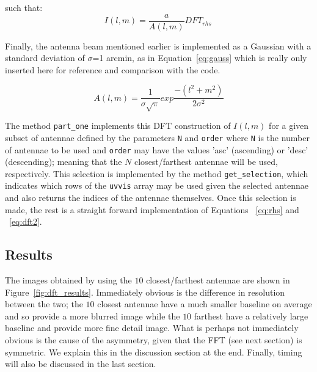 \documentclass[11pt,letterpaper]{article}
\begin{document}
such that:
\begin{equation}\label{eq:dft2}
I(l,m)= \frac{a}{A(l,m)} DFT_{rhs} \,
\end{equation}

Finally, the antenna beam mentioned earlier is implemented as a Gaussian with a standard deviation of $\sigma$=1 arcmin, as in Equation~\ref{eq:gauss} which is really only inserted here for reference and comparison with the code.

\begin{equation}\label{eq:gauss}
A(l,m)= \frac{1}{\sigma \sqrt{\pi}} exp{ \frac{-(l^{2} + m^{2})}{2 \sigma^{2}} }
\end{equation}

The method \texttt{part\_one} implements this DFT construction of $I(l,m)$ for a given subset of antennae defined by the parameters \texttt{N} and \texttt{order} where \texttt{N} is the number of antennae to be used and \texttt{order} may have the values 'asc' (ascending) or 'desc' (descending); meaning that the $N$ closest/farthest antennae will be used, respectively. This selection is implemented by the method \texttt{get\_selection}, which indicates which rows of the \texttt{uvvis} array may be used given the selected antennae and also returns the indices of the antennae themselves. Once this selection is made, the rest is a straight forward implementation of Equations ~\ref{eq:rhs} and ~\ref{eq:dft2}.

\subsection{Results}

The images obtained by using the $10$ closest/farthest antennae are shown in Figure~\ref{fig:dft_results}. Immediately obvious is the difference in resolution between the two; the $10$ closest antennae have a much smaller baseline on average and so provide a more blurred image while the $10$ farthest have a relatively large baseline and provide more fine detail image. What is perhaps not immediately obvious is the cause of the asymmetry, given that the FFT (see next section) is symmetric. We explain this in the discussion section at the end. Finally, timing will also be discussed in the last section.
\end{document}
